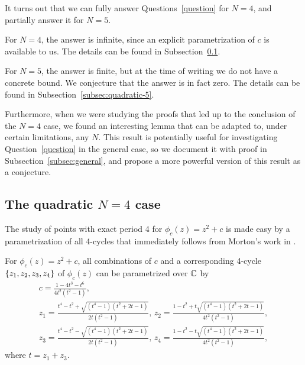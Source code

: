 It turns out that we can fully answer Questions~\ref{question} for
$N = 4$, and partially answer it for $N = 5$.

For $N = 4$, the answer is infinite, since an explicit parametrization
of $c$ is available to us. The details can be found in
Subsection~\ref{subsec:quadratic-4}.

For $N = 5$, the answer is finite, but at the time of writing we do
not have a concrete bound. We conjecture that the answer is in fact
zero. The details can be found in Subsection~\ref{subsec:quadratic-5}.

Furthermore, when we were studying the proofs that led up to the
conclusion of the $N = 4$ case, we found an interesting lemma that can
be adapted to, under certain limitations, any $N$. This result is
potentially useful for investigating Question~\ref{question} in the
general case, so we document it with proof in
Subsection~\ref{subsec:general}, and propose a more powerful version
of this result as a conjecture.

\subsection{The quadratic $N = 4$ case}
\label{subsec:quadratic-4}

The study of points with exact period 4 for $\phi_c(z) = z^2 + c$ is
made easy by a parametrization of all 4-cycles that immediately
follows from Morton's work in \cite{MR1665198}.

\begin{proposition}
  For $\phi_c(z) = z^2 + c$, all combinations of $c$ and a
  corresponding 4-cycle $\left\{z_1, z_2, z_3, z_4\right\}$ of $\phi_c(z)$ can
  be parametrized over $\mathbb{C}$ by
  \begin{equation}
    \label{eq:4-param}
    \begin{gathered}
      c = \frac{1 - 4t^3 - t^6}{4t^2(t^2 - 1)}, \\
      z_1 = \frac{t^4 - t^2 + \sqrt{(t^4 - 1)(t^2 + 2t - 1)}}{2t(t^2 -
        1)},\,
      z_2 = \frac{1 - t^2 + t \sqrt{(t^4 - 1)(t^2 + 2t - 1)}}{4t^2(t^2
        - 1)}, \\
      z_3 = \frac{t^4 - t^2 - \sqrt{(t^4 - 1)(t^2 + 2t - 1)}}{2t(t^2 -
        1)},\,
      z_4 = \frac{1 - t^2 - t \sqrt{(t^4 - 1)(t^2 + 2t - 1)}}{4t^2(t^2
        - 1)},
    \end{gathered}
  \end{equation}
  where $t = z_1 + z_3$.
\end{proposition}

